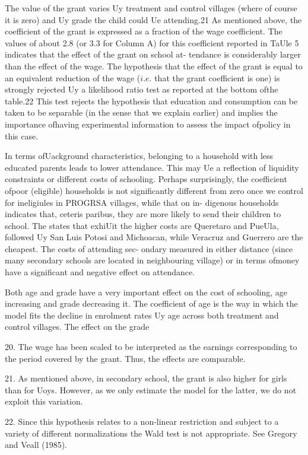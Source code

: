 The value of the grant varies Uy treatment and control villages (where of course it is zero) and Uy grade the child could Ue attending.21 As mentioned above, the coefficient of the grant is expressed as a fraction of the wage coefficient. The values of about 2.8 (or 3.3 for Column A) for this coefficient reported in TaUle 5 indicates that the effect of the grant on school at- tendance is considerably larger than the effect of the wage. The hypothesis that the effect of the grant is equal to an equivalent reduction of the wage ($i.e$. that the grant coefficient is one) is strongly rejected Uy a likelihood ratio test as reported at the bottom ofthe table.22 This test rejects the hypothesis that education and consumption can be taken to be separable (in the sense that we explain earlier) and implies the importance ofhaving experimental information to assess the impact ofpolicy in this case.

In terms ofUackground characteristics, belonging to a household with less educated parents leads to lower attendance. This may Ue a reflection of liquidity constraints or different costs of schooling. Perhaps surprisingly, the coefficient ofpoor (eligible) households is not significantly different from zero once we control for ineligiules in PROGRSA villages, while that on in- digenous households indicates that, ceteris paribus, they are more likely to send their children to school. The states that exhiUit the higher costs are Queretaro and PueUla, followed Uy San Luis Potosi and Michoacan, while Veracruz and Guerrero are the cheapest. The costs of attending sec- ondary measured in either distance (since many secondary schools are located in neighbouring village) or in terms ofmoney have a significant and negative effect on attendance.

Both age and grade have a very important effect on the cost of schooling, age increasing and grade decreasing it. The coefficient of age is the way in which the model fits the decline in enrolment rates Uy age across both treatment and control villages. The effect on the grade

20. The wage has been scaled to be interpreted as the earnings corresponding to the period covered by the grant. Thus, the effects are comparable.

21. As mentioned above, in secondary school, the grant is also higher for girls than for Uoys. However, as we only estimate the model for the latter, we do not exploit this variation.

22. Since this hypothesis relates to a non-linear restriction and subject to a variety of different normalizations the Wald test is not appropriate. See Gregory and Veall (1985).

